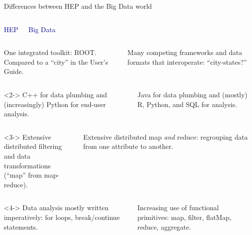 \documentclass{beamer}
\begin{document}
\begin{frame}{Differences between HEP and the Big Data world}
\begin{columns}
\centering \textcolor{darkblue}{HEP}

\centering \textcolor{darkblue}{Big Data}
\end{columns}

\vfill
\begin{columns}
One integrated toolkit: ROOT. Compared to a ``city'' in the User's Guide.

Many competing frameworks and data formats that interoperate: ``city-states?''
\end{columns}

\vfill
{}

\vfill
\begin{columns}<2->
C++ for data plumbing and (increasingly) Python for end-user analysis.

Java for data plumbing and (mostly) R, Python, and SQL for analysis.
\end{columns}

\vfill
{}

\vfill
\begin{columns}<3->
Extensive distributed filtering \\ and data transformations \\ (``map'' from map-reduce).

Extensive distributed map {\it and} reduce: regrouping data from one attribute to another.
\end{columns}

\vfill
{}

\vfill
\begin{columns}<4->
Data analysis mostly written imperatively: for loops, break/continue statements.

Increasing use of functional primitives: map, filter, flatMap, reduce, aggregate.
\end{columns}
\end{frame}
\end{document}
